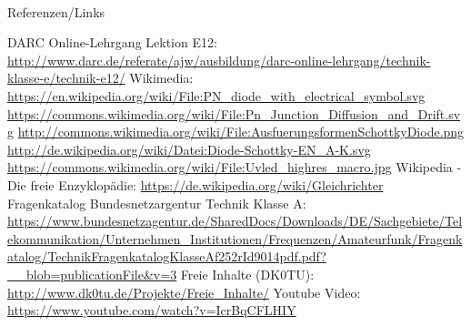 \renewcommand{\refname}{Referenzen}

\hypertarget{refs}{}
\textcolor{white}{} \\ %
\Large Referenzen/Links
\footnotesize

\begin{thebibliography}{}
      DARC Online-Lehrgang Lektion E12:
                    \url{http://www.darc.de/referate/ajw/ausbildung/darc-online-lehrgang/technik-klasse-e/technik-e12/}
     	Wikimedia:
                    \url{https://en.wikipedia.org/wiki/File:PN_diode_with_electrical_symbol.svg}
                    \url{https://commons.wikimedia.org/wiki/File:Pn_Junction_Diffusion_and_Drift.svg}
                    \url{http://commons.wikimedia.org/wiki/File:AusfuerungsformenSchottkyDiode.png}
                    \url{http://de.wikipedia.org/wiki/Datei:Diode-Schottky-EN_A-K.svg}
                    \url{https://commons.wikimedia.org/wiki/File:Uvled_highres_macro.jpg}
                    \url{}
        Wikipedia - Die freie Enzyklopädie:
                    \url{https://de.wikipedia.org/wiki/Gleichrichter}
	   Fragenkatalog Bundesnetzargentur Technik Klasse A:                   
                    \url{https://www.bundesnetzagentur.de/SharedDocs/Downloads/DE/Sachgebiete/Telekommunikation/Unternehmen_Institutionen/Frequenzen/Amateurfunk/Fragenkatalog/TechnikFragenkatalogKlasseAf252rId9014pdf.pdf?__blob=publicationFile&v=3}
        Freie Inhalte (DK0TU):
                    \url{http://www.dk0tu.de/Projekte/Freie_Inhalte/}
         Youtube Video:                   
                    \url{https://www.youtube.com/watch?v=IcrBqCFLHIY}

\end{thebibliography} 


